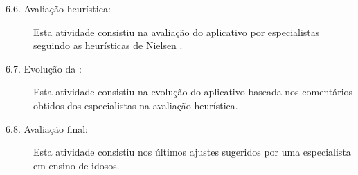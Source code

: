 \begin{description}
\begin{description}
    \item[6.6. Avaliação heurística:] 
    Esta atividade consistiu na avaliação do aplicativo por especialistas seguindo as heurísticas de Nielsen \citep{nielsen2005ten}.
    
    \item[6.7. Evolução da \crossword:] 
    Esta atividade consistiu na evolução do aplicativo baseada nos comentários obtidos dos especialistas na avaliação heurística.
    
     \item[6.8. Avaliação final:] 
    Esta atividade consistiu nos últimos ajustes sugeridos por uma especialista em ensino de idosos.
\end{description}

\end{description}